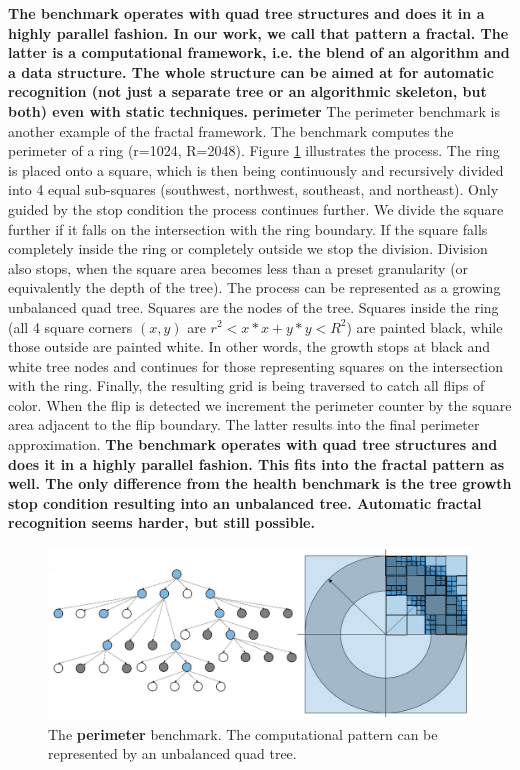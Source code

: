 \quad \textbf{The benchmark operates with quad tree structures and does it in a highly parallel fashion. In our work, we call that pattern a fractal. The latter is a computational framework, i.e. the blend of an algorithm and a data structure. The whole structure can be aimed at for automatic recognition (not just a separate tree or an algorithmic skeleton, but both) even with static techniques.}\newline\null
\quad \textbf{perimeter} \quad The perimeter benchmark is another example of the fractal framework. The benchmark computes the perimeter of a ring (r=1024, R=2048). Figure \ref{fig:perimeter_benchmark} illustrates the process. The ring is placed onto a square, which is then being continuously and recursively divided into 4 equal sub-squares (southwest, northwest, southeast, and northeast). Only guided by the stop condition the process continues further. We divide the square further if it falls on the intersection with the ring boundary. If the square falls completely inside the ring or completely outside we stop the division. Division also stops, when the square area becomes less than a preset granularity (or equivalently the depth of the tree). The process can be represented as a growing unbalanced quad tree. Squares are the nodes of the tree. Squares inside the ring (all 4 square corners $(x,y)$ are $r^{2} < x*x + y*y < R^{2}$) are painted black, while those outside are painted white. In other words, the growth stops at black and white tree nodes and continues for those representing squares on the intersection with the ring. Finally, the resulting grid is being traversed to catch all flips of color. When the flip is detected we increment the perimeter counter by the square area adjacent to the flip boundary. The latter results into the final perimeter approximation.\newline\null
\quad \textbf{The benchmark operates with quad tree structures and does it in a highly parallel fashion. This fits into the fractal pattern as well. The only difference from the health benchmark is the tree growth stop condition resulting into an unbalanced tree. Automatic fractal recognition seems harder, but still possible.}
\begin{figure}[ht]
\begin{center}
\includegraphics[width=1.0\textwidth]{images/perimeter_benchmark.png}
\caption{The \textbf{perimeter} benchmark. The computational pattern can be represented by an unbalanced quad tree.}
\label{fig:perimeter_benchmark}
\end{center}
\end{figure}\newline\null

